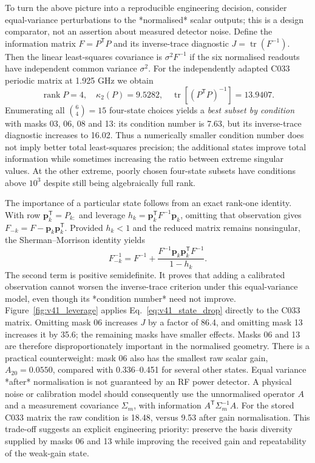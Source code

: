 \documentclass{ieeeaccess}
\begin{document}
To turn the above picture into a reproducible engineering decision, consider equal-variance perturbations to the *normalised* scalar outputs; this is a design comparator, not an assertion about measured detector noise. Define the information matrix $F=P^{\mathsf T}P$ and its inverse-trace diagnostic $J=\operatorname{tr}(F^{-1})$. Then the linear least-squares covariance is $\sigma^2F^{-1}$ if the six normalised readouts have independent common variance $\sigma^2$. For the independently adapted C033 periodic matrix at 1.925 GHz we obtain
\begin{equation}
 \operatorname{rank}P=4,\quad \kappa_2(P)=9.5282,\quad
 \operatorname{tr}[(P^{\mathsf T}P)^{-1}]=13.9407.
 \label{eq:v41_result}
\end{equation}
Enumerating all $\binom64=15$ four-state choices yields a \emph{best subset by condition} with masks 03, 06, 08 and 13: its condition number is 7.63, but its inverse-trace diagnostic increases to 16.02. Thus a numerically smaller condition number does not imply better total least-squares precision; the additional states improve total information while sometimes increasing the ratio between extreme singular values. At the other extreme, poorly chosen four-state subsets have conditions above $10^3$ despite still being algebraically full rank.

The importance of a particular state follows from an exact rank-one identity. With row $\mathbf p_k^{\mathsf T}=P_{k:}$ and leverage $h_k=\mathbf p_k^{\mathsf T}F^{-1}\mathbf p_k$, omitting that observation gives $F_{-k}=F-\mathbf p_k\mathbf p_k^{\mathsf T}$. Provided $h_k<1$ and the reduced matrix remains nonsingular, the Sherman--Morrison identity yields
\begin{equation}
 F_{-k}^{-1}=F^{-1}+\frac{F^{-1}\mathbf p_k\mathbf p_k^{\mathsf T}F^{-1}}{1-h_k}.
 \label{eq:v41_state_drop}
\end{equation}
The second term is positive semidefinite. It proves that adding a calibrated observation cannot worsen the inverse-trace criterion under this equal-variance model, even though its *condition number* need not improve. Figure~\ref{fig:v41_leverage} applies Eq.~\eqref{eq:v41_state_drop} directly to the C033 matrix. Omitting mask 06 increases $J$ by a factor of 86.4, and omitting mask 13 increases it by 35.6; the remaining masks have smaller effects. Masks 06 and 13 are therefore disproportionately important in the normalised geometry. There is a practical counterweight: mask 06 also has the smallest raw scalar gain, $A_{20}=0.0550$, compared with 0.336--0.451 for several other states. Equal variance *after* normalisation is not guaranteed by an RF power detector. A physical noise or calibration model should consequently use the unnormalised operator $A$ and a measurement covariance $\Sigma_m$, with information $A^{\mathsf T}\Sigma_m^{-1}A$. For the stored C033 matrix the raw condition is 18.48, versus 9.53 after gain normalisation. This trade-off suggests an explicit engineering priority: preserve the basis diversity supplied by masks 06 and 13 while improving the received gain and repeatability of the weak-gain state.
\end{document}

